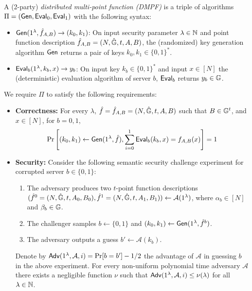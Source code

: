 \begin{definition}[DMPF]\label{def:dmpf}
  A 
  (2-party)
  \emph{distributed multi-point function (DMPF)}
  is a triple of algorithms %
  $\Pi=({\sf Gen},{\sf Eval}_0,{\sf Eval}_1)$
  with the following syntax: 
  \begin{itemize}
      \item ${\sf Gen}(1^\lambda,\hat{f}_{A,B})\rightarrow (k_0,k_1)$: On input security parameter $\lambda\in\mathbb{N}$ and point function description $\hat{f}_{A,B}=(N,\hat{\mathbb{G}},t,A,B)$, the (randomized) key generation algorithm ${\sf Gen}$ returns a pair of keys $k_0,k_1\in\{0,1\}^*$. 
      \item ${\sf Eval}_b(1^\lambda, k_b,x)\rightarrow y_b$: On input key $k_b\in\{0,1\}^*$ and input $x\in[N]$ the (deterministic) evaluation algorithm of server $b$, ${\sf Eval}_b$ returns $y_b\in\mathbb{G}$.
  \end{itemize}
  We require $\Pi$ to satisfy the following requirements:
  \begin{itemize}
      \item \textbf{Correctness:} For every $\lambda$, $\hat{f}=\hat{f}_{A,B}=(N,\hat{\mathbb{G}},t,A,B)$ such that $B\in\mathbb{G}^t$, and $x\in[N]$, for $b=0,1$,
      $$\Pr\left[(k_0,k_1)\leftarrow{\sf Gen}(1^\lambda,\hat{f}), \sum_{i=0}^{1}{\sf Eval}_b(k_b,x)=f_{A,B}(x)\right]=1$$
      \item \textbf{Security:} Consider the following semantic security challenge experiment for corrupted server $b\in\{0,1\}$:
      \begin{enumerate}
          \item The adversary produces two $t$-point function descriptions $(\hat{f}^0=(N,\hat{\mathbb{G}},t,A_0,B_0),\hat{f}^1=(N,\hat{\mathbb{G}},t,A_1,B_1))\leftarrow\mathcal{A}(1^\lambda)$, where $\alpha_b\in[N]$ and $\beta_b\in\mathbb{G}$.
          \item The challenger samples $b\gets\{0,1\}$ and $(k_0,k_1)\leftarrow{\sf Gen}(1^\lambda,\hat{f}^b)$.
          \item The adversary outputs a guess $b'\leftarrow\mathcal{A}(k_b)$.
      \end{enumerate}
      Denote by ${\sf Adv}(1^\lambda,\mathcal{A},i)=\Pr[b=b']-1/2$ the advantage of $\mathcal{A}$ in guessing $b$ in the above experiment. For every non-uniform polynomial time adversary $\mathcal{A}$ there exists a negligible function $\nu$ such that ${\sf Adv}(1^\lambda,\mathcal{A},i) \le \nu(\lambda)$ for all $\lambda \in \mathbb{N}$.
  \end{itemize}
  \end{definition}
 
